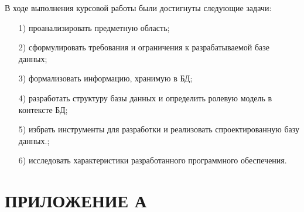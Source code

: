 \documentclass{bmstu}
\begin{document}
В ходе выполнения курсовой работы были достигнуты следующие задачи:
\begin{enumerate}
	\item[1)] проанализировать предметную область;
	\item[2)] сформулировать требования и ограничения к разрабатываемой базе данных;
	\item[3)] формализовать информацию, хранимую в БД;
	\item[4)] разработать структуру базы данных и определить ролевую модель в контексте БД;
	\item[5)] избрать инструменты для разработки и реализовать спроектированную базу данных.;
	\item[6)] исследовать характеристики разработанного программного обеспечения.
\end{enumerate}

{\centering \printbibliography[title=СПИСОК ИСПОЛЬЗОВАННЫХ ИСТОЧНИКОВ,heading=bibintoc]}

{\centering \chapter*{ПРИЛОЖЕНИЕ А}}
\end{document}
